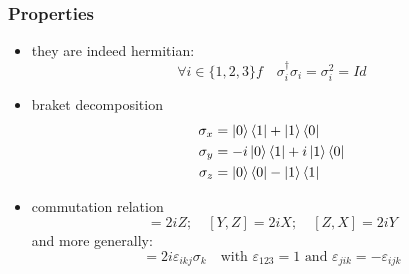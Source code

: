 \documentclass{article}
\begin{document}
\subsubsection*{Properties}
\begin{itemize}[label=-]
    \item they are indeed hermitian:
    \begin{equation}
        \forall i \in \{1, 2, 3\} f\quad \sigma_i^\dagger\sigma_i = \sigma_i^2 = Id
    \end{equation}
    \item braket decomposition
    \begin{equation}
        \begin{aligned}
            \sigma_x & = \ket{0}\bra{1} + \ket{1}\bra{0}
            \\
            \sigma_y & = -i\ket{0}\bra{1} + i\ket{1}\bra{0}
            \\
            \sigma_z & = \ket{0}\bra{0} - \ket{1}\bra{1}
        \end{aligned}
    \end{equation}
    \item commutation relation %
        \begin{equation}
            [X,Y] = 2iZ; \quad [Y, Z] = 2iX; \quad [Z,X] = 2iY
        \end{equation}
    and more generally:
        \begin{equation}
            [\sigma_i, \sigma_j] = 2i\varepsilon_{ikj}\sigma_k\quad\text{with }\varepsilon_{123} = 1 \text{ and } \varepsilon_{jik}=-\varepsilon_{ijk}
        \end{equation}

\end{itemize}
\end{document}
